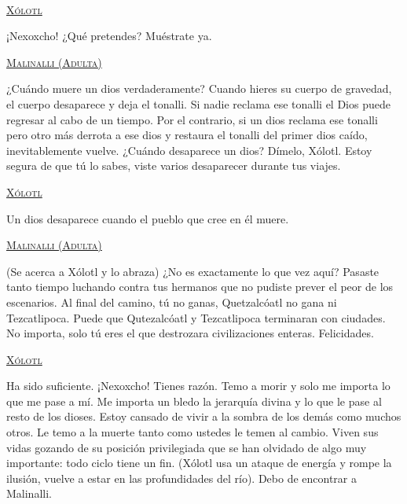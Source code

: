 \begin{center}
\\
\par
 \textsc{\underline{Xólotl}}
\\
\par
¡Nexoxcho! ¿Qué pretendes? Muéstrate ya.
\\
\par
\textsc{\underline{Malinalli (Adulta)}}
\\
\par
¿Cuándo muere un dios verdaderamente? Cuando hieres su cuerpo de gravedad, el cuerpo desaparece y deja el tonalli. Si nadie reclama ese tonalli el Dios puede regresar al cabo de un tiempo. Por el contrario, si un dios reclama ese tonalli pero otro más derrota a ese dios y restaura el tonalli del primer dios caído, inevitablemente vuelve. ¿Cuándo desaparece un dios? Dímelo, Xólotl. Estoy segura de que tú lo sabes, viste varios desaparecer durante tus viajes.
\\
\par
\textsc{\underline{Xólotl}}
\\
\par
Un dios desaparece cuando el pueblo que cree en él muere.
\\
\par
\textsc{\underline{Malinalli (Adulta)}}
\\
\par
(Se acerca a Xólotl y lo abraza) ¿No es exactamente lo que vez aquí? Pasaste tanto tiempo luchando contra tus hermanos que no pudiste prever el peor de los escenarios. Al final del camino, tú no ganas, Quetzalcóatl no gana ni Tezcatlipoca. Puede que Qutezalcóatl y Tezcatlipoca terminaran con ciudades. No importa, solo tú eres el que destrozara civilizaciones enteras. Felicidades.
\\
\par
\textsc{\underline{Xólotl}}
\\
\par
Ha sido suficiente. ¡Nexoxcho! Tienes razón. Temo a morir y solo me importa lo que me pase a mí. Me importa un bledo la jerarquía divina y lo que le pase al resto de los dioses. Estoy cansado de vivir a la sombra de los demás como muchos otros. Le temo a la muerte tanto como ustedes le temen al cambio. Viven sus vidas gozando de su posición privilegiada que se han olvidado de algo muy importante: todo ciclo tiene un fin. (Xólotl usa un ataque de energía y rompe la ilusión, vuelve a estar en las profundidades del río). Debo de encontrar a Malinalli.  
\end{center}